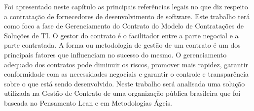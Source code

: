 Foi apresentado neste capítulo as principais referências legais no que diz respeito a contratação de fornecedores de desenvolvimento de software. Este trabalho terá como foco a fase de Gerenciamento do Contrato do Modelo de Contratações de Soluções de TI. O gestor do contrato é o facilitador entre a parte negocial e a parte contratada. A forma ou metodologia de gestão de um contrato é um dos principais fatores que influenciam no sucesso do mesmo. O gerenciamento adequado dos contratos pode diminuir os riscos, promover mais rapidez, garantir conformidade com as necessidades negociais e garantir o controle e transparência sobre o que está sendo desenvolvido. Neste trabalho será analisada uma solução utilizada na Gestão de Contrato de uma organização pública brasileira que foi baseada no Pensamento Lean e em Metodologias Ágeis.

